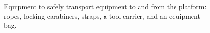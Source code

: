 \begin{figure}
\begin{center}
\end{center}
\caption{Equipment to safely transport equipment to and from the platform: ropes, locking carabiners, straps, a tool carrier, and an equipment bag.}
\label{figure:safety-transport}
\end{figure}


